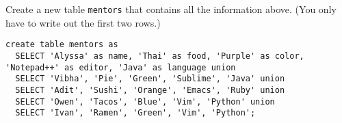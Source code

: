 \question Create a new table \lstinline$mentors$ that contains all the information above.
(You only have to write out the first two rows.)

\begin{solution}[3in]
\begin{lstlisting}
create table mentors as
  SELECT 'Alyssa' as name, 'Thai' as food, 'Purple' as color, 'Notepad++' as editor, 'Java' as language union
  SELECT 'Vibha', 'Pie', 'Green', 'Sublime', 'Java' union
  SELECT 'Adit', 'Sushi', 'Orange', 'Emacs', 'Ruby' union
  SELECT 'Owen', 'Tacos', 'Blue', 'Vim', 'Python' union
  SELECT 'Ivan', 'Ramen', 'Green', 'Vim', 'Python';
\end{lstlisting}
\end{solution}
